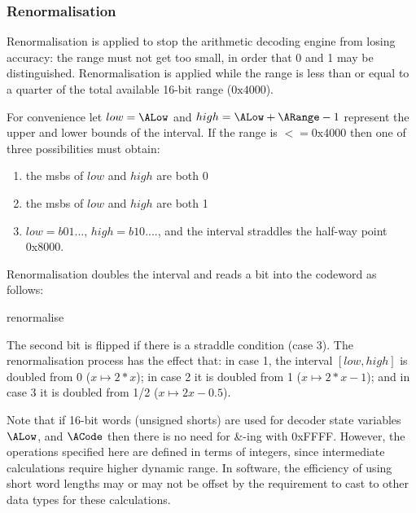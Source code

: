 \subsubsection{Renormalisation}
\label{renormalisation}

Renormalisation is applied to stop the arithmetic decoding 
engine from losing accuracy: the range must not get too small,
 in order that 0 and 1 may be distinguished. Renormalisation is
 applied while the range is less than or equal to a quarter of 
 the total available 16-bit range ($\text{0x4000}$). 

For convenience let $low=\ALow$ and $high=\ALow+\ARange-1$ 
represent the upper and lower bounds of the interval. If the
range is $<=\text{0x4000}$ then
one of three possibilities must obtain:
\begin{enumerate}
\item the msbs of $low$ and $high$ are both 0
\item the msbs of $low$ and $high$ are both 1
\item $low=b01...$, $high=b10....$,  and the interval straddles the half-way point 0x8000. 
\end{enumerate}

Renormalisation doubles the interval and reads a bit into the codeword
as follows:

\begin{pseudo}{renormalise}{}
\bsEND
{}
\end{pseudo}

The second bit is flipped if there is a straddle condition (case 3). The renormalisation
process has the effect that: in case 1, the interval $[low,high]$ is doubled from 0 ($x\mapsto 2*x$); 
in case 2 it is doubled from 1 ($x\mapsto 2*x-1$); and in case 3 it is doubled from 1/2 ($x\mapsto 2x-0.5$).
 
\begin{informative}
Note that if 16-bit words (unsigned shorts) are used for decoder state variables $\ALow$,
 and $\ACode$ then there is no need for {\&}-ing with 0xFFFF. However, the 
operations specified here are defined in terms of integers, since intermediate calculations
 require higher dynamic range. In software, the efficiency of using short word lengths may
or may not be offset by the requirement to cast to other data types for these calculations.
\end{informative}

